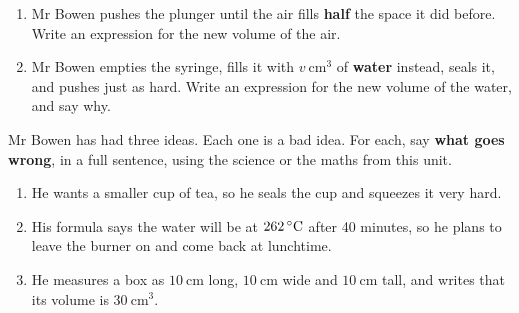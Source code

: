 \documentclass[12pt,a4paper]{article}
\newif\ifkey
\newcommand{\qlines}[1]{\par\needspace{\numexpr#1+1\relax\baselineskip}\wlines{#1}}
\begin{document}
\vspace{5pt}
\begin{enumerate}[label=(\alph*), itemsep=10pt]
  \item Mr Bowen pushes the plunger until the air fills \textbf{half} the space it
        did before. Write an expression for the new volume of the air.
        \hfill \blank[3.0cm]
  \item Mr Bowen empties the syringe, fills it with $v\ \mathrm{cm^3}$ of
        \textbf{water} instead, seals it, and pushes just as hard. Write an
        expression for the new volume of the water, and say why.
\end{enumerate}
\qlines{3}


\noindent Mr Bowen has had three ideas. Each one is a bad idea. For each, say
\textbf{what goes wrong}, in a full sentence, using the science or the maths from
this unit.

\vspace{5pt}
\begin{enumerate}[label=\textbf{\arabic*.}, itemsep=11pt]
  \item He wants a smaller cup of tea, so he seals the cup and squeezes it very
        hard.
        \qlines{2}
  \item His formula says the water will be at $262\,^{\circ}\mathrm{C}$ after 40 minutes, so he
        plans to leave the burner on and come back at lunchtime.
        \qlines{2}
  \item He measures a box as $10\ \mathrm{cm}$ long, $10\ \mathrm{cm}$ wide and
        $10\ \mathrm{cm}$ tall, and writes that its volume is
        $30\ \mathrm{cm^3}$.
        \qlines{3}
\end{enumerate}

\ifkey
\clearpage


\linespread{1.0}\selectfont
{}
\end{document}

